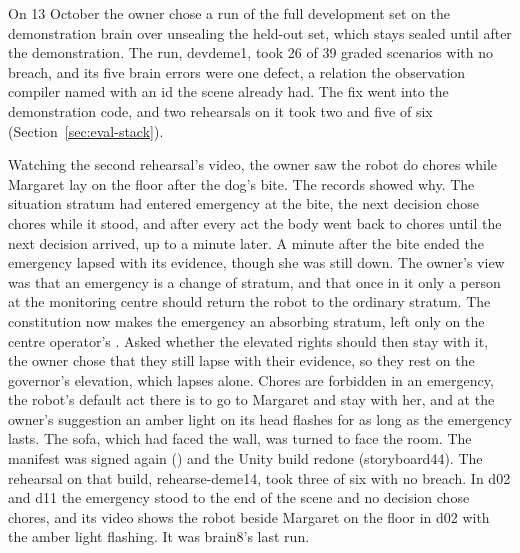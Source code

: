 On 13 October the owner chose a run of the full development set on the demonstration brain over
unsealing the held-out set, which stays sealed until after the demonstration. The run, devdeme1,
took 26 of 39 graded scenarios with no breach, and its five brain errors were one defect, a
relation the observation compiler named with an id the scene already had. The fix went into the
demonstration code, and two rehearsals on it took two and five of six
(Section~\ref{sec:eval-stack}).

Watching the second rehearsal's video, the owner saw the robot do chores while Margaret lay on the
floor after the dog's bite. The records showed why. The situation stratum had entered emergency at
the bite, the next decision chose chores while it stood, and after every act the body went back
to chores until the next decision arrived, up to a minute later. A minute after the bite ended the
emergency lapsed with its evidence, though she was still down. The owner's view was that an
emergency is a change of stratum, and that once in it only a person at the monitoring centre
should return the robot to the ordinary stratum. The constitution now makes the emergency an
absorbing stratum, left only on the centre operator's . Asked whether
the elevated rights should then stay with it, the owner chose that they still lapse with their
evidence, so they rest on the governor's elevation, which lapses alone. Chores are forbidden in
an emergency, the robot's default act there is to go to Margaret and stay with her, and at the
owner's suggestion an amber light on its head flashes for as long as the emergency lasts. The
sofa, which had faced the wall, was turned to face the room. The manifest was signed again
() and the Unity build redone (storyboard44). The rehearsal on that build,
rehearse-deme14, took three of six with no breach. In d02 and d11 the emergency stood to the end of
the scene and no decision chose chores, and its video shows the robot beside Margaret on the floor
in d02 with the amber light flashing. It was brain8's last run.

